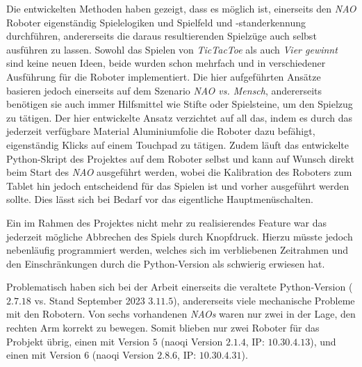 Die entwickelten Methoden haben gezeigt, dass es möglich ist, einerseits den \textit{NAO} Roboter eigenständig Spielelogiken und Spielfeld und -standerkennung durchführen, andererseits die daraus resultierenden Spielzüge auch selbst ausführen zu lassen. Sowohl das Spielen von \textit{TicTacToe} als auch \textit{Vier gewinnt} sind keine neuen Ideen, beide wurden schon mehrfach und in verschiedener Ausführung für die Roboter implementiert\cite{nao_tictactoe_magnets, nao_tictactoe_pen, nao_connect4_1, nao_connect4_2}. Die hier aufgeführten Ansätze basieren jedoch einerseits auf dem Szenario \textit{NAO vs. Mensch}, andererseits benötigen sie auch immer Hilfsmittel wie Stifte oder Spielsteine, um den Spielzug zu tätigen. Der hier entwickelte Ansatz verzichtet auf all das, indem es durch das jederzeit verfügbare Material Aluminiumfolie die Roboter dazu befähigt, eigenständig Klicks auf einem Touchpad zu tätigen. Zudem läuft das entwickelte Python-Skript des Projektes auf dem Roboter selbst und kann auf Wunsch direkt beim Start des \textit{NAO} ausgeführt werden, wobei die Kalibration des Roboters zum Tablet hin jedoch entscheidend für das Spielen ist und vorher ausgeführt werden sollte. Dies lässt sich bei Bedarf vor das eigentliche \dq Hauptmenü\dq schalten.  

Ein im Rahmen des Projektes nicht mehr zu realisierendes Feature war das jederzeit mögliche Abbrechen des Spiels durch Knopfdruck. Hierzu müsste jedoch nebenläufig programmiert werden, welches sich im verbliebenen Zeitrahmen und den Einschränkungen durch die Python-Version als schwierig erwiesen hat.

Problematisch haben sich bei der Arbeit einerseits die veraltete Python-Version ($2.7.18$ vs. Stand September 2023 $3.11.5$), andererseits viele mechanische Probleme mit den Robotern. Von sechs vorhandenen \textit{NAOs} waren nur zwei in der Lage, den rechten Arm korrekt zu bewegen. Somit blieben nur zwei Roboter für das Probjekt übrig, einen mit Version $5$ (naoqi Version $2.1.4$, IP: $10.30.4.13$), und einen mit Version $6$ (naoqi Version $2.8.6$, IP: $10.30.4.31$).

